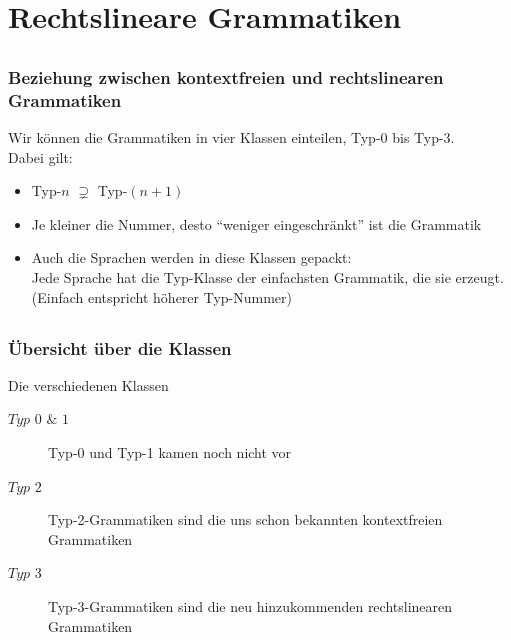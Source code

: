 \section{Rechtslineare Grammatiken}

\subsection*{}
\begin{frame}
\frametitle{Beziehung zwischen kontextfreien und rechtslinearen Grammatiken}
	Wir können die Grammatiken in vier Klassen einteilen, Typ-0 bis Typ-3.\\
	Dabei gilt:
  	\begin{itemize}
    		\item Typ-$n$ $\supsetneq$ Typ-$(n+1)$
    		\item Je kleiner die Nummer, desto "`weniger eingeschränkt"' ist die Grammatik
    		\item Auch die Sprachen werden in diese Klassen gepackt: \\
    		Jede Sprache hat die Typ-Klasse der einfachsten Grammatik, die sie
    		erzeugt. \\ (Einfach entspricht höherer Typ-Nummer)
  	\end{itemize}
\end{frame}

\subsection*{}
\begin{frame}
	\frametitle{Übersicht über die Klassen}
	\begin{block}{Die verschiedenen Klassen}
  	\begin{description}
    		\item[$Typ$ $0$ $\&$ $1$] Typ-0 und Typ-1 kamen noch nicht vor
    		\item[$Typ$ $2$] Typ-2-Grammatiken sind die uns schon bekannten kontextfreien Grammatiken
    		\item[$Typ$ $3$] Typ-3-Grammatiken sind die neu hinzukommenden rechtslinearen Grammatiken
  	\end{description}
  	\end{block}
\end{frame}

